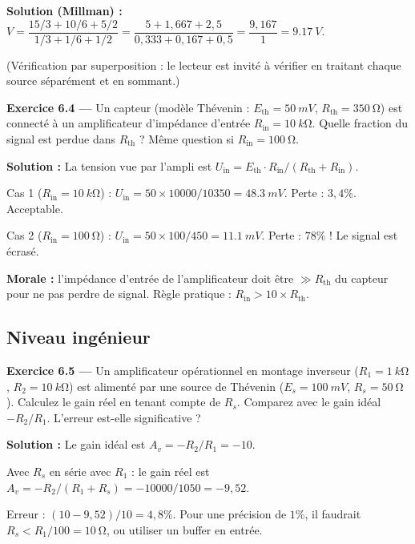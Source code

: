 \documentclass[12pt,a4paper,twoside]{book}
\begin{document}
\begin{pratique}
\textbf{Solution (Millman) :}
$V = \dfrac{15/3 + 10/6 + 5/2}{1/3 + 1/6 + 1/2} = \dfrac{5 + 1{,}667 + 2{,}5}{0{,}333 + 0{,}167 + 0{,}5} = \dfrac{9{,}167}{1} = \SI{9.17}{V}$.

(Vérification par superposition : le lecteur est invité à vérifier en traitant chaque source séparément et en sommant.)
\end{pratique}

\textbf{Exercice 6.4 ---} Un capteur (modèle Thévenin : $E_{\text{th}} = \SI{50}{mV}$, $R_{\text{th}} = \SI{350}{\ohm}$) est connecté à un amplificateur d'impédance d'entrée $R_{\text{in}} = \SI{10}{k\ohm}$. Quelle fraction du signal est perdue dans $R_{\text{th}}$ ? Même question si $R_{\text{in}} = \SI{100}{\ohm}$.

\begin{pratique}
\textbf{Solution :} La tension vue par l'ampli est $U_{\text{in}} = E_{\text{th}} \cdot R_{\text{in}}/(R_{\text{th}} + R_{\text{in}})$.

Cas 1 ($R_{\text{in}} = \SI{10}{k\ohm}$) : $U_{\text{in}} = 50 \times 10000/10350 = \SI{48.3}{mV}$. Perte : $3{,}4\%$. Acceptable.

Cas 2 ($R_{\text{in}} = \SI{100}{\ohm}$) : $U_{\text{in}} = 50 \times 100/450 = \SI{11.1}{mV}$. Perte : $78\%$ ! Le signal est écrasé.

\textbf{Morale :} l'impédance d'entrée de l'amplificateur doit être $\gg R_{\text{th}}$ du capteur pour ne pas perdre de signal. Règle pratique : $R_{\text{in}} > 10 \times R_{\text{th}}$.
\end{pratique}

\subsection*{Niveau ingénieur}

\textbf{Exercice 6.5 ---} Un amplificateur opérationnel en montage inverseur ($R_1 = \SI{1}{k\ohm}$, $R_2 = \SI{10}{k\ohm}$) est alimenté par une source de Thévenin ($E_s = \SI{100}{mV}$, $R_s = \SI{50}{\ohm}$). Calculez le gain réel en tenant compte de $R_s$. Comparez avec le gain idéal $-R_2/R_1$. L'erreur est-elle significative ?

\begin{pratique}
\textbf{Solution :} Le gain idéal est $A_v = -R_2/R_1 = -10$.

Avec $R_s$ en série avec $R_1$ : le gain réel est $A_v = -R_2/(R_1 + R_s) = -10000/1050 = -9{,}52$.

Erreur : $(10 - 9{,}52)/10 = 4{,}8\%$. Pour une précision de $1\%$, il faudrait $R_s < R_1/100 = \SI{10}{\ohm}$, ou utiliser un buffer en entrée.
\end{pratique}
\end{document}
